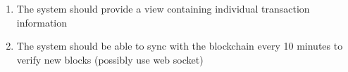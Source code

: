 \begin{adjustwidth}{1.5em}{0pt}
\begin{enumerate}[label=3.\arabic*]
		\item The system should provide a view containing individual transaction information

    \item The system should be able to sync with the blockchain every 10 minutes to verify new blocks (possibly use web socket)
		
\end{enumerate}


	
\end{adjustwidth}
